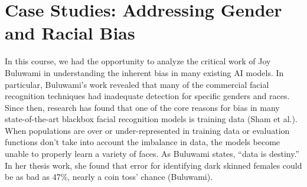 \documentclass[10pt]{article}
\begin{document}
\section{Case Studies: Addressing Gender and Racial Bias}

  In this course, we had the opportunity to analyze the critical work of Joy Buluwami in understanding the inherent bias in many existing AI models. In particular, Buluwami’s work revealed that many of the commercial facial recognition techniques had inadequate detection for specific genders and races. Since then, research has found that one of the core reasons for bias in many state-of-the-art blackbox facial recognition models is training data (Sham et al.). When populations are over or under-represented in training data or evaluation functions don’t take into account the imbalance in data, the models become unable to properly learn a variety of faces. As Buluwami states, “data is destiny.” In her thesis work, she found that error for identifying dark skinned females could be as bad as 47\%, nearly a coin toss’ chance (Buluwami).
\end{document}
